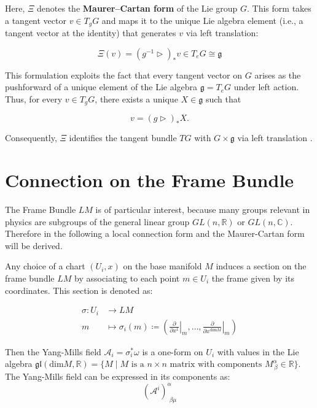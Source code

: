 Here, \( \Xi \) denotes the \textbf{Maurer–Cartan form} of the Lie group \( G \). This form takes a tangent vector \( v \in T_gG \) and maps it to the unique Lie algebra element (i.e., a tangent vector at the identity) that generates \( v \) via left translation:

\[
\Xi(v) = (g^{-1} \triangleright)_* v \in T_eG \cong \mathfrak{g}
\]

This formulation exploits the fact that every tangent vector on \( G \) arises as the pushforward of a unique element of the Lie algebra \( \mathfrak{g} = T_eG \) under left action\cite{RaghunathanLieGroupsLieAlgebras2025}. Thus, for every \( v \in T_gG \), there exists a unique \( X \in \mathfrak{g} \) such that

\[
v = (g \triangleright)_* X.
\]

Consequently, \( \Xi \) identifies the tangent bundle \( TG \) with \( G \times \mathfrak{g} \) via left translation \cite{MaurerCartanform2025}.

\section{Connection on the Frame Bundle}

The Frame Bundle $LM$ is of particular interest, because many groups relevant in physics are subgroups of the general linear group \( GL(n, \mathbb{R}) \) or \( GL(n, \mathbb{C}) \). Therefore in the following a local connection form and the Maurer-Cartan form will be derived.

Any choice of a chart \( (U_i, x) \) on the base manifold \( M \) induces a section on the frame bundle \( LM \) by associating to each point \( m \in U_i \) the frame given by its coordinates. This section is denoted as:

\begin{align*}
  \sigma : U_i &\longrightarrow LM \\
  m &\mapsto \sigma_i(m) \coloneq \left( \left. \frac{\partial}{\partial x^1} \right|_m, \dots , \left. \frac{\partial}{\partial x^{\text{dim}M}} \right|_m  \right)
\end{align*}



Then the Yang-Mills field \( \mathcal{A}_i = \sigma_i^* \omega \) is a one-form on \( U_i \) with values in the Lie algebra $\mathfrak{gl}(\text{dim}M,\mathbb{R}) = \{ M \mid M \text{ is a } n\times n \text{ matrix with components } M^\alpha_{\,\beta}\in \mathbb{R} \}$. The Yang-Mills field can be expressed in its components as:
\[ (\mathcal{A}^i)^\alpha_{\,\,\beta\mu} \]

